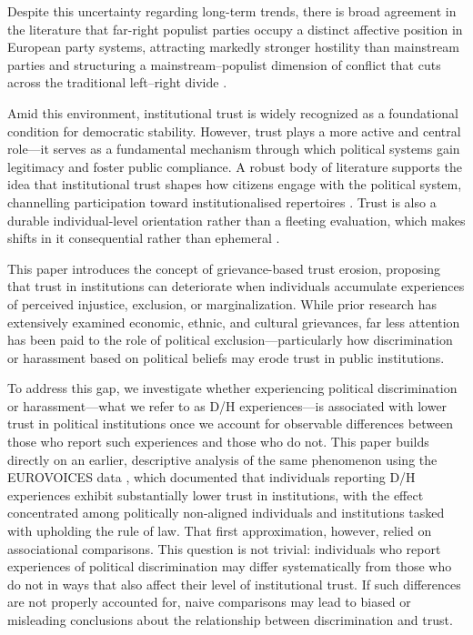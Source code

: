\documentclass{article}
\begin{document}
Despite this uncertainty regarding long-term trends, there is broad agreement in the literature that far-right populist parties occupy a distinct affective position in European party systems, attracting markedly stronger hostility than mainstream parties and structuring a mainstream–populist dimension of conflict that cuts across the traditional left–right divide \parencite{reiljan_fear_2020, reiljan_andres_affective_2025}.

Amid this environment, institutional trust is widely recognized as a foundational condition for democratic stability. However, trust plays a more active and central role—it serves as a fundamental mechanism through which political systems gain legitimacy and foster public compliance. A robust body of literature supports the idea that institutional trust shapes how citizens engage with the political system, channelling participation toward institutionalised repertoires \parencite{Hooghe01022013}. Trust is also a durable individual-level orientation rather than a fleeting evaluation, which makes shifts in it consequential rather than ephemeral \parencite{devine_stability_2024}.

This paper introduces the concept of grievance-based trust erosion, proposing that trust in institutions can deteriorate when individuals accumulate experiences of perceived injustice, exclusion, or marginalization. While prior research has extensively examined economic, ethnic, and cultural grievances, far less attention has been paid to the role of political exclusion—particularly how discrimination or harassment based on political beliefs may erode trust in public institutions.

To address this gap, we investigate whether experiencing political discrimination or harassment—what we refer to as D/H experiences—is associated with lower trust in political institutions once we account for observable differences between those who report such experiences and those who do not. This paper builds directly on an earlier, descriptive analysis of the same phenomenon using the EUROVOICES data \parencite{montoya2025trustbreakers}, which documented that individuals reporting D/H experiences exhibit substantially lower trust in institutions, with the effect concentrated among politically non-aligned individuals and institutions tasked with upholding the rule of law. That first approximation, however, relied on associational comparisons. This question is not trivial: individuals who report experiences of political discrimination may differ systematically from those who do not in ways that also affect their level of institutional trust. If such differences are not properly accounted for, naive comparisons may lead to biased or misleading conclusions about the relationship between discrimination and trust.
\end{document}

